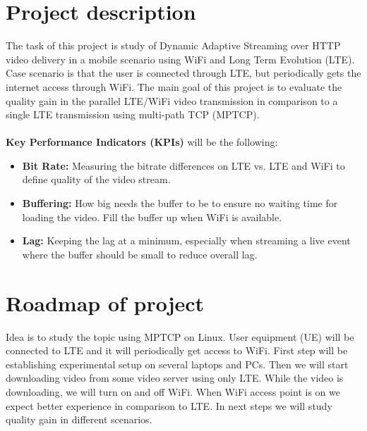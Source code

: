 \documentclass{llncs}
\begin{document}
\section{Project description}
The task of this project is study of Dynamic Adaptive Streaming over HTTP video delivery in a mobile scenario using WiFi and Long Term Evolution (LTE). Case scenario is that the user is connected through LTE, but periodically gets the internet access through WiFi. The main goal of this project is to evaluate the quality gain in the parallel LTE/WiFi video transmission in comparison to a single LTE transmission using multi-path TCP (MPTCP).\\ \\
\textbf{Key Performance Indicators (KPIs)} will be the following:
\begin{itemize}
\item \textbf{Bit Rate:} Measuring the bitrate differences on LTE vs. LTE and WiFi to define quality of the video stream.
\item \textbf{Buffering:} How big needs the buffer to be to ensure no waiting time for loading the video. Fill the buffer up when WiFi is available.
\item \textbf{Lag:} Keeping the lag at a minimum, especially when streaming a live event where the buffer should be small to reduce overall lag.
\end{itemize}


\section{Roadmap of project}
Idea is to study the topic using MPTCP on Linux. User equipment (UE) will be connected to LTE and it will periodically get access to WiFi. First step will be establishing experimental setup on several laptops and PCs. Then we will start downloading video from some video server using only LTE. While the video is downloading, we will turn on and off WiFi. When WiFi access point is on we expect better experience in comparison to LTE.  In next steps we will study quality gain in different scenarios. 
\end{document}
